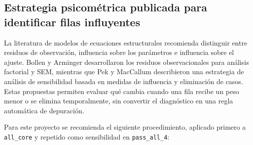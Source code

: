 \documentclass[11pt,a4paper]{article}
\begin{document}
\subsection{Estrategia psicométrica publicada para identificar filas influyentes}

La literatura de modelos de ecuaciones estructurales recomienda distinguir entre residuos de observación, influencia sobre los parámetros e influencia sobre el ajuste. Bollen y Arminger desarrollaron los residuos observacionales para análisis factorial y SEM, mientras que Pek y MacCallum describieron una estrategia de análisis de sensibilidad basada en medidas de influencia y eliminación de casos. Estas propuestas permiten evaluar qué cambia cuando una fila recibe un peso menor o se elimina temporalmente, sin convertir el diagnóstico en una regla automática de depuración.

Para este proyecto se recomienda el siguiente procedimiento, aplicado primero a \texttt{all\_core} y repetido como sensibilidad en \texttt{pass\_all\_4}:
\end{document}
